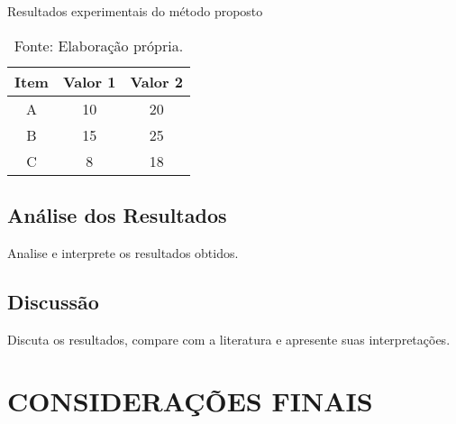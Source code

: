 \documentclass[12pt, a4paper, brazil, oneside]{abntex2}
\begin{document}
\begin{table}[tb]                                      %
\centering
\caption{Resultados experimentais do método proposto} %
\label{tab:resultados_experimento}                    %
\begin{tabular}{|c|c|c|}
\hline
\textbf{Item} & \textbf{Valor 1} & \textbf{Valor 2} \\
\hline
A & 10 & 20 \\
B & 15 & 25 \\
C & 8 & 18 \\
\hline
\end{tabular}
\caption*{Fonte: Elaboração própria.}
\end{table}
%

\section{Análise dos Resultados}

Analise e interprete os resultados obtidos.

\section{Discussão}

Discuta os resultados, compare com a literatura e apresente suas interpretações.


\chapter{CONSIDERAÇÕES FINAIS}

\end{document}
